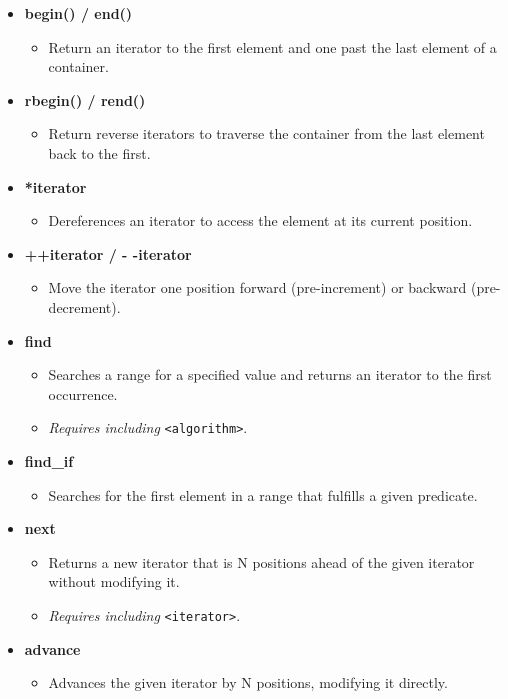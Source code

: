 \documentclass{report}
\begin{document}
\begin{itemize}
	\item \textbf{begin() / end()}
	      \begin{itemize}
		      \item Return an iterator to the first element and one past the last element of a container.
	      \end{itemize}
	\item \textbf{rbegin() / rend()}
	      \begin{itemize}
		      \item Return reverse iterators to traverse the container from the last element back to the first.
	      \end{itemize}
	\item \textbf{*iterator}
	      \begin{itemize}
		      \item Dereferences an iterator to access the element at its current position.
	      \end{itemize}
	\item \textbf{++iterator / - -iterator}
	      \begin{itemize}
		      \item Move the iterator one position forward (pre-increment) or backward (pre-decrement).
	      \end{itemize}
	\item \textbf{find}
	      \begin{itemize}
		      \item Searches a range for a specified value and returns an iterator to the first occurrence.
		      \item \textit{Requires including} \texttt{<algorithm>}.
	      \end{itemize}
	\item \textbf{find\_if}
	      \begin{itemize}
		      \item Searches for the first element in a range that fulfills a given predicate.
	      \end{itemize}
	\item \textbf{next}
	      \begin{itemize}
		      \item Returns a new iterator that is N positions ahead of the given iterator without modifying it.
		      \item \textit{Requires including} \texttt{<iterator>}.
	      \end{itemize}
	\item \textbf{advance}
	      \begin{itemize}
		      \item Advances the given iterator by N positions, modifying it directly.
	      \end{itemize}
\end{itemize}
\end{document}
